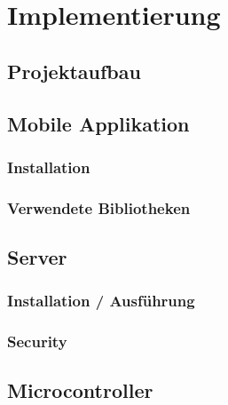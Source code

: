\section{Implementierung}

    \subsection{Projektaufbau}
    
    \subsection{Mobile Applikation}
        
        \subsubsection{Installation}
        \subsubsection{Verwendete Bibliotheken}

\subsection{Server}
    
    \subsubsection{Installation / Ausführung}
    \subsubsection{Security}

\subsection{Microcontroller}
    
    